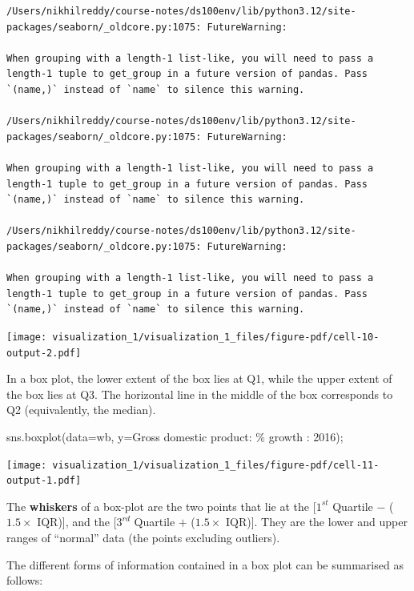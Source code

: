 \documentclass[
  letterpaper,
  DIV=11,
  numbers=noendperiod]{scrreprt}
\newenvironment{Shaded}{\begin{snugshade}}{\end{snugshade}}
\newcommand{\NormalTok}[1]{\textcolor[rgb]{0.00,0.23,0.31}{#1}}
\newcommand{\OperatorTok}[1]{\textcolor[rgb]{0.37,0.37,0.37}{#1}}
\newcommand{\SpecialCharTok}[1]{\textcolor[rgb]{0.37,0.37,0.37}{#1}}
\newcommand{\StringTok}[1]{\textcolor[rgb]{0.13,0.47,0.30}{#1}}
\begin{document}
\begin{verbatim}
/Users/nikhilreddy/course-notes/ds100env/lib/python3.12/site-packages/seaborn/_oldcore.py:1075: FutureWarning:

When grouping with a length-1 list-like, you will need to pass a length-1 tuple to get_group in a future version of pandas. Pass `(name,)` instead of `name` to silence this warning.

/Users/nikhilreddy/course-notes/ds100env/lib/python3.12/site-packages/seaborn/_oldcore.py:1075: FutureWarning:

When grouping with a length-1 list-like, you will need to pass a length-1 tuple to get_group in a future version of pandas. Pass `(name,)` instead of `name` to silence this warning.

/Users/nikhilreddy/course-notes/ds100env/lib/python3.12/site-packages/seaborn/_oldcore.py:1075: FutureWarning:

When grouping with a length-1 list-like, you will need to pass a length-1 tuple to get_group in a future version of pandas. Pass `(name,)` instead of `name` to silence this warning.
\end{verbatim}

\texttt{[image: visualization\_1/visualization\_1\_files/figure-pdf/cell-10-output-2.pdf]}

In a box plot, the lower extent of the box lies at Q1, while the upper
extent of the box lies at Q3. The horizontal line in the middle of the
box corresponds to Q2 (equivalently, the median).

\begin{Shaded}
\begin{Highlighting}[]
\NormalTok{sns.boxplot(data}\OperatorTok{=}\NormalTok{wb, y}\OperatorTok{=}\StringTok{\textquotesingle{}Gross domestic product: }\SpecialCharTok{\% g}\StringTok{rowth : 2016\textquotesingle{}}\NormalTok{)}\OperatorTok{;}
\end{Highlighting}
\end{Shaded}

\texttt{[image: visualization\_1/visualization\_1\_files/figure-pdf/cell-11-output-1.pdf]}

The \textbf{whiskers} of a box-plot are the two points that lie at the
{[}\(1^{st}\) Quartile \(-\) (\(1.5\times\) IQR){]}, and the
{[}\(3^{rd}\) Quartile \(+\) (\(1.5\times\) IQR){]}. They are the lower
and upper ranges of ``normal'' data (the points excluding outliers).

The different forms of information contained in a box plot can be
summarised as follows:
\end{document}
